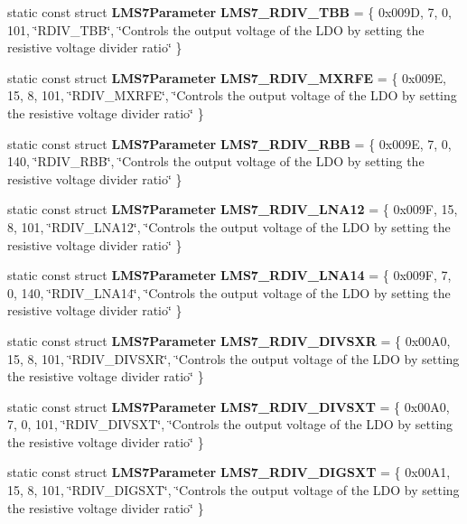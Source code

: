 \begin{DoxyCompactItemize}
\item 
static const struct {\bf L\+M\+S7\+Parameter} {\bf L\+M\+S7\+\_\+\+R\+D\+I\+V\+\_\+\+T\+BB} = \{ 0x009\+D, 7, 0, 101, \char`\"{}\+R\+D\+I\+V\+\_\+\+T\+B\+B\char`\"{}, \char`\"{}\+Controls the output voltage of the L\+D\+O by setting the resistive voltage divider ratio\char`\"{} \}
\item 
static const struct {\bf L\+M\+S7\+Parameter} {\bf L\+M\+S7\+\_\+\+R\+D\+I\+V\+\_\+\+M\+X\+R\+FE} = \{ 0x009\+E, 15, 8, 101, \char`\"{}\+R\+D\+I\+V\+\_\+\+M\+X\+R\+F\+E\char`\"{}, \char`\"{}\+Controls the output voltage of the L\+D\+O by setting the resistive voltage divider ratio\char`\"{} \}
\item 
static const struct {\bf L\+M\+S7\+Parameter} {\bf L\+M\+S7\+\_\+\+R\+D\+I\+V\+\_\+\+R\+BB} = \{ 0x009\+E, 7, 0, 140, \char`\"{}\+R\+D\+I\+V\+\_\+\+R\+B\+B\char`\"{}, \char`\"{}\+Controls the output voltage of the L\+D\+O by setting the resistive voltage divider ratio\char`\"{} \}
\item 
static const struct {\bf L\+M\+S7\+Parameter} {\bf L\+M\+S7\+\_\+\+R\+D\+I\+V\+\_\+\+L\+N\+A12} = \{ 0x009\+F, 15, 8, 101, \char`\"{}\+R\+D\+I\+V\+\_\+\+L\+N\+A12\char`\"{}, \char`\"{}\+Controls the output voltage of the L\+D\+O by setting the resistive voltage divider ratio\char`\"{} \}
\item 
static const struct {\bf L\+M\+S7\+Parameter} {\bf L\+M\+S7\+\_\+\+R\+D\+I\+V\+\_\+\+L\+N\+A14} = \{ 0x009\+F, 7, 0, 140, \char`\"{}\+R\+D\+I\+V\+\_\+\+L\+N\+A14\char`\"{}, \char`\"{}\+Controls the output voltage of the L\+D\+O by setting the resistive voltage divider ratio\char`\"{} \}
\item 
static const struct {\bf L\+M\+S7\+Parameter} {\bf L\+M\+S7\+\_\+\+R\+D\+I\+V\+\_\+\+D\+I\+V\+S\+XR} = \{ 0x00\+A0, 15, 8, 101, \char`\"{}\+R\+D\+I\+V\+\_\+\+D\+I\+V\+S\+X\+R\char`\"{}, \char`\"{}\+Controls the output voltage of the L\+D\+O by setting the resistive voltage divider ratio\char`\"{} \}
\item 
static const struct {\bf L\+M\+S7\+Parameter} {\bf L\+M\+S7\+\_\+\+R\+D\+I\+V\+\_\+\+D\+I\+V\+S\+XT} = \{ 0x00\+A0, 7, 0, 101, \char`\"{}\+R\+D\+I\+V\+\_\+\+D\+I\+V\+S\+X\+T\char`\"{}, \char`\"{}\+Controls the output voltage of the L\+D\+O by setting the resistive voltage divider ratio\char`\"{} \}
\item 
static const struct {\bf L\+M\+S7\+Parameter} {\bf L\+M\+S7\+\_\+\+R\+D\+I\+V\+\_\+\+D\+I\+G\+S\+XT} = \{ 0x00\+A1, 15, 8, 101, \char`\"{}\+R\+D\+I\+V\+\_\+\+D\+I\+G\+S\+X\+T\char`\"{}, \char`\"{}\+Controls the output voltage of the L\+D\+O by setting the resistive voltage divider ratio\char`\"{} \}

\end{DoxyCompactItemize}
